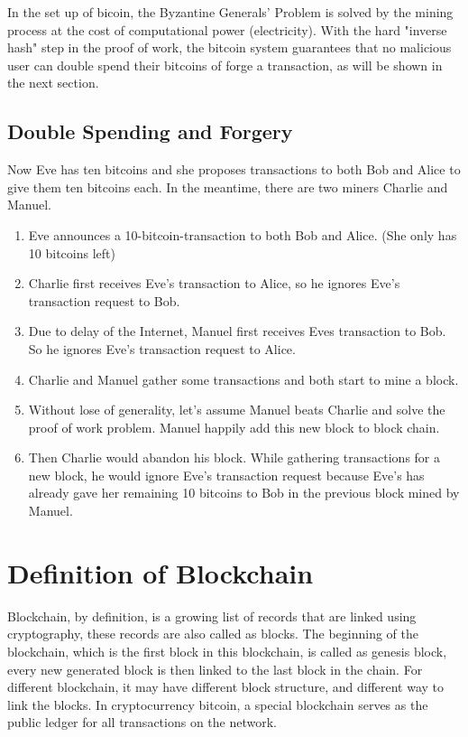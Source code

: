 \documentclass[12pt,a4paper]{article}
\begin{document}
In the set up of bicoin, the Byzantine Generals' Problem is solved by the mining process at the cost of computational power (electricity). With the hard "inverse hash" step in the proof of work, the bitcoin system guarantees that no malicious user can double spend their bitcoins of forge a transaction, as will be shown in the next section.
\subsection{Double Spending and Forgery} 
Now Eve has ten bitcoins and she proposes transactions to both Bob and Alice to give them ten bitcoins each. In the meantime, there are two miners Charlie and Manuel.
\begin{enumerate}
	\item Eve announces a 10-bitcoin-transaction to  both Bob and Alice. (She only has 10 bitcoins left)
	\item Charlie first receives Eve's transaction to Alice, so he ignores Eve's transaction request to Bob.
	\item Due to delay of the Internet, Manuel first receives Eves transaction to Bob. So he ignores Eve's transaction request to Alice.
	\item Charlie and Manuel gather some transactions and both start to mine a block. 
	\item Without lose of generality, let's assume Manuel beats Charlie and solve the proof of work problem. Manuel happily add this new block to block chain. 
	\item Then Charlie would abandon his block. While gathering transactions for a new block, he would ignore Eve's transaction request because Eve's has already gave her remaining 10 bitcoins to Bob in the previous block mined by Manuel. 
\end{enumerate}

\section{Definition of Blockchain}\label{def}
Blockchain, by definition, is a growing list of records that are linked using cryptography, these records are also called as blocks. The beginning of the blockchain, which is the first block in this blockchain, is called as genesis block, every new generated block is then linked to the last block in the chain. For different blockchain, it may have different block structure, and different way to link the blocks. In cryptocurrency bitcoin, a special blockchain serves as the public ledger for all transactions on the network. 
\end{document}
